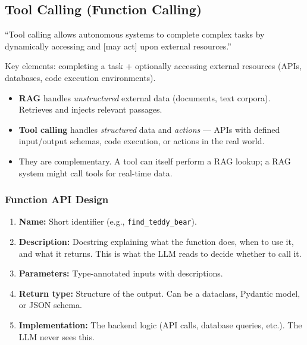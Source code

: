 \documentclass[11pt, a4paper]{article}
\begin{document}
\subsection{Tool Calling (Function Calling)}

\begin{defbox}
``Tool calling allows autonomous systems to complete complex tasks by dynamically accessing and [may act] upon external resources.''

Key elements: completing a task + optionally accessing external resources (APIs, databases, code execution environments).
\end{defbox}

\begin{notebox}
\begin{itemize}[leftmargin=1.5em]
  \item \textbf{RAG} handles \emph{unstructured} external data (documents, text corpora). Retrieves and injects relevant passages.
  \item \textbf{Tool calling} handles \emph{structured} data and \emph{actions} --- APIs with defined input/output schemas, code execution, or actions in the real world.
  \item They are complementary. A tool can itself perform a RAG lookup; a RAG system might call tools for real-time data.
\end{itemize}
\end{notebox}

\subsubsection{Function API Design}

\begin{defbox}
\begin{enumerate}[leftmargin=1.5em]
  \item \textbf{Name:} Short identifier (e.g., \texttt{find\_teddy\_bear}).
  \item \textbf{Description:} Docstring explaining what the function does, when to use it, and what it returns. This is what the LLM reads to decide whether to call it.
  \item \textbf{Parameters:} Type-annotated inputs with descriptions.
  \item \textbf{Return type:} Structure of the output. Can be a dataclass, Pydantic model, or JSON schema.
  \item \textbf{Implementation:} The backend logic (API calls, database queries, etc.). The LLM never sees this.
\end{enumerate}
\end{defbox}
\end{document}
